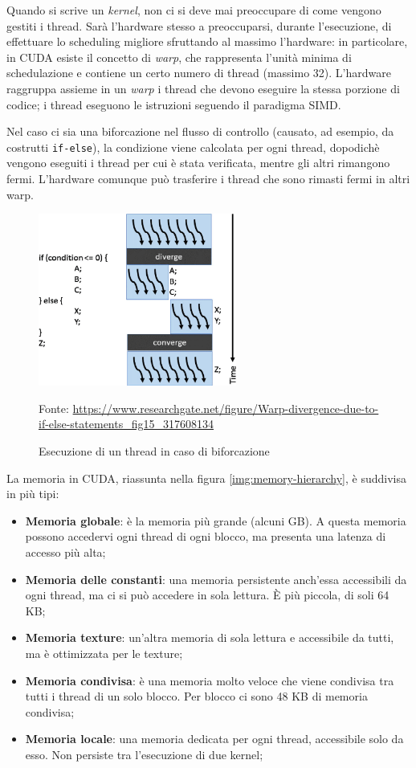 \documentclass[12pt,a4paper,openright,twoside]{report}
\newcommand{\source}[1]{\caption*{\hfill \scriptsize Fonte: {#1}} }
\begin{document}
Quando si scrive un \textit{kernel}, non ci si deve mai preoccupare di come vengono gestiti i thread. Sarà l'hardware stesso a preoccuparsi, durante l'esecuzione, di effettuare lo scheduling migliore sfruttando al massimo l'hardware: in particolare, in CUDA esiste il concetto di \textit{warp}, che rappresenta l'unità minima di schedulazione e contiene un certo numero di thread (massimo 32). L'hardware raggruppa assieme in un \textit{warp} i thread che devono eseguire la stessa porzione di codice; i thread eseguono le istruzioni seguendo il paradigma SIMD.

Nel caso ci sia una biforcazione nel flusso di controllo (causato, ad esempio, da costrutti \verb|if-else|), la condizione viene calcolata per ogni thread, dopodichè vengono eseguiti i thread per cui è stata verificata, mentre gli altri rimangono fermi. L'hardware comunque può trasferire i thread che sono rimasti fermi in altri warp.

\begin{figure}[h]
    \centering
    \includegraphics[width=6.5cm]{warp-branch.png}
    \source{\url{https://www.researchgate.net/figure/Warp-divergence-due-to-if-else-statements_fig15_317608134}}
    \caption{Esecuzione di un thread in caso di biforcazione}
    \label{img:warp-branch}
\end{figure}

La memoria in CUDA, riassunta nella figura \ref{img:memory-hierarchy}, è suddivisa in più tipi:

\begin{itemize}
    \item \textbf{Memoria globale}: è la memoria più grande (alcuni GB). A questa memoria possono accedervi ogni thread di ogni blocco, ma presenta una latenza di accesso più alta;
    \item \textbf{Memoria delle constanti}: una memoria persistente anch'essa accessibili da ogni thread, ma ci si può accedere in sola lettura. È più piccola, di soli 64 KB;
    \item \textbf{Memoria texture}: un'altra memoria di sola lettura e accessibile da tutti, ma è ottimizzata per le texture;
    \item \textbf{Memoria condivisa}: è una memoria molto veloce che viene condivisa tra tutti i thread di un solo blocco. Per blocco ci sono 48 KB di memoria condivisa;
    \item \textbf{Memoria locale}: una memoria dedicata per ogni thread, accessibile solo da esso. Non persiste tra l'esecuzione di due kernel;
\end{itemize}
\end{document}
